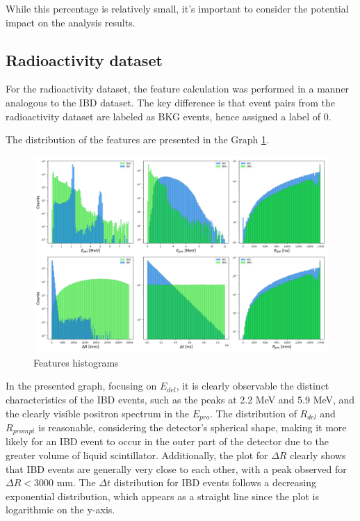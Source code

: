 While this percentage is relatively small, it's important to consider the potential impact on the analysis results.

\subsection{Radioactivity dataset}
For the radioactivity dataset, the feature calculation was performed in a manner analogous to the IBD dataset. The key difference is that event pairs from the radioactivity dataset are labeled as BKG events, hence assigned a label of 0.

The distribution of the features are presented in the Graph \ref{fig:hist_features}.
\begin{figure}[h]
	\centering
	\includegraphics[width=1\linewidth]{Images/hist_features.png}
	\caption{Features histograms}
	\label{fig:hist_features}
\end{figure}

In the presented graph, focusing on $E_{del}$, it is clearly observable the distinct characteristics of the IBD events, such as the peaks at 2.2 MeV and 5.9 MeV, and the clearly visible positron spectrum in the $E_{pro}$. The distribution of $R_{del}$ and $R_{prompt}$ is reasonable, considering the detector's spherical shape, making it more likely for an IBD event to occur in the outer part of the detector due to the greater volume of liquid scintillator. Additionally, the plot for \( \Delta R \) clearly shows that IBD events are generally very close to each other, with a peak observed for \( \Delta R < 3000 \) mm. The \( \Delta t \) distribution for IBD events follows a decreasing exponential distribution, which appears as a straight line since the plot is logarithmic on the y-axis.

